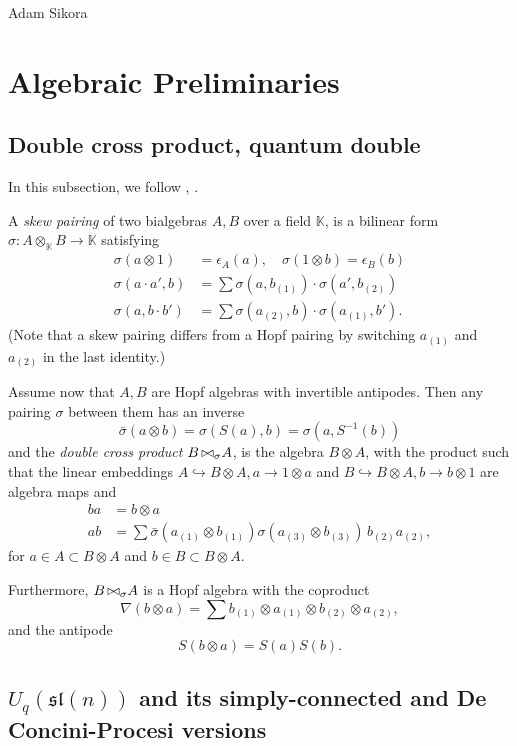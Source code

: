 \documentclass[11pt]{amsart}
\theoremstyle{plain}
\theoremstyle{definition}
\def\sl{{\mathfrak{sl}}}
\def\embed{\hookrightarrow}
\def\ot{{\otimes}}
\def\bipr{{
  \triangleright\mathrel{\mkern-12mu}
  \triangleleft}}
\def\K{\mathbb K}
\begin{document}
\begin{center}
{\large Adam Sikora}
\end{center}
\section{Algebraic Preliminaries}

\subsection{Double cross product, quantum double} In this subsection, we follow \cite{Majid2}, \cite[Section 8.2]{KS}. 

 A {\em skew pairing} of two bialgebras $A,B$ over a field $\K$, is a bilinear form $\sigma: A \ot_\K B \to \K$ satisfying
\begin{align}
\sigma(a\ot 1) & = \epsilon_A(a),\quad  \sigma( 1 \ot b)  = \epsilon_B(b )\label{e.pairing1}\\
\sigma(a\cdot a', b )&= \sum \sigma(a, b_{(1)})\cdot \sigma (a', b_{(2)}) \\
\sigma(a, b\cdot b')&= \sum \sigma ( a_{(2)},b)\cdot \sigma (a_{(1)},b').\label{e.pairing3} 
\end{align}
(Note that a skew pairing differs from a Hopf pairing by switching $a_{(1)}$ and $a_{(2)}$ in the last identity.) 

Assume now that $A,B$ are Hopf algebras with invertible antipodes. Then any pairing $\sigma$ between them has an inverse
$$\bar \sigma(a\ot b) = \sigma(S(a), b) = \sigma(a, S^{-1}(b))$$
and the {\em double cross product} $B \, \bipr _\sigma A$, is the algebra $B \ot A$, with the product such that the linear embeddings $A \embed B \ot A, a \to 1\ot a$ and $B \embed B \ot A, b \to b\ot 1$ are algebra maps and
\begin{align}
b a &= b \ot a \label{e.ba}\\
ab &= \sum \bar \sigma(a_{(1)} \ot b_{(1)}) \sigma(a_{(3)} \ot b_{(3)}) \, b_{(2)} a_{(2)},\label{e.ab}
\end{align}
for $a\in A \subset B \ot A$ and $b \in B \subset B\ot A$.

Furthermore,  $B \, \bipr _\sigma A$ is a Hopf algebra with the coproduct 
$$\nabla(b\ot a)=\sum b_{(1)}\ot a_{(1)}\ot b_{(2)}\ot a_{(2)},$$
and the antipode
$$S(b \ot a)= S(a)S(b).$$


\subsection{$U_q(\sl(n))$ and its simply-connected and De Concini-Procesi versions}
\label{ss.Uq}
\end{document}
